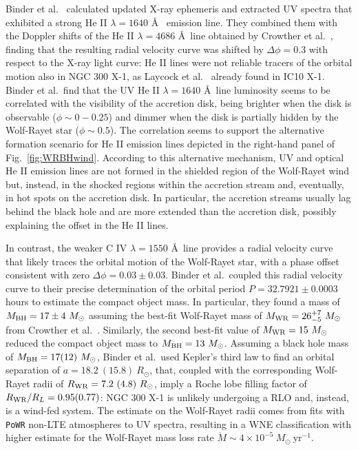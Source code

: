 \documentclass[a4paper,titlepage]{book}     	%
\newcommand{\sun}{\ensuremath{_\odot}}
\newcommand{\mdot}{\ensuremath{\dot{M}}}
\newcommand{\msun}{\ensuremath{M\sun}}
\newcommand{\rsun}{R_{\odot}}
\newcommand{\yr}{\text{yr}}
\newcommand{\mwr}{\ensuremath{M_\textup{WR}}}
\newcommand{\mbh}{\ensuremath{M_\textup{BH}}}
\begin{document}
Binder et al.\ \cite{NGC300X-1_Binder2021_BHpreciso} calculated updated X-ray ephemeris and extracted UV spectra that exhibited a strong He II $\lambda=1640$ \AA~ emission line. They combined them with the Doppler shifts of the He II $\lambda=4686$ \AA ~line obtained by Crowther et al.\ \cite{NGC300X-1_Crowther2010}, finding that the resulting radial velocity curve was shifted by $\Delta \phi = 0.3$ with respect to the X-ray light curve: He II lines were not reliable tracers of the orbital motion also in NGC 300 X-1, as Laycock et al.\ \cite{laycock2015_IC10X1_measuredshift} already found in IC10 X-1. Binder et al.\ find that the UV He II $\lambda=1640$ \AA~line luminosity seems to be correlated with the visibility of the accretion disk, being brighter when the disk is observable ($\phi \sim 0-0.25$) and dimmer when the disk is partially hidden by the Wolf-Rayet star ($\phi \sim 0.5$). The correlation seems to support the alternative formation scenario for He II emission lines depicted in the right-hand panel of Fig.\ \ref{fig:WRBHwind}. According to this alternative mechanism, UV and optical He II emission lines are not formed in the shielded region of the Wolf-Rayet wind but, instead, in the shocked regions within the accretion stream and, eventually, in hot spots on the accretion disk. In particular, the accretion streams usually lag behind the black hole and are more extended than the accretion disk, possibly explaining the offset in the He II lines.

In contrast, the weaker C IV $\lambda=1550$ \AA~line provides a radial velocity curve that likely traces the orbital motion of the Wolf-Rayet star, with a phase offset consistent with zero $\Delta \phi = 0.03 \pm 0.03$. Binder et al.\ coupled this radial velocity curve to their precise determination of the orbital period $P=32.7921 \pm 0.0003$ hours to estimate the compact object mass. In particular, they found a mass of $\mbh = 17 \pm 4~\msun$ assuming the best-fit Wolf-Rayet mass of $\mwr = 26_{-5}^{+7}~\msun$ from Crowther et al.\ \cite{NGC300X-1_Crowther2010}. Similarly, the second best-fit value of $\mwr = 15~\msun$ reduced the compact object mass to $\mbh = 13~\msun$. Assuming a black hole mass of $\mbh = 17(12)~\msun$, Binder et al.\ used Kepler's third law to find an orbital separation of $a = 18.2~(15.8)~\rsun$, that, coupled with the corresponding Wolf-Rayet radii of $R_{\rm WR} = 7.2~(4.8)~\rsun$, imply a Roche lobe filling factor of $R_{\rm WR}/R_L = 0.95 (0.77)$: NGC 300 X-1 is unlikely undergoing a RLO and, instead, is a wind-fed system. The estimate on the Wolf-Rayet radii comes from fits with \texttt{PoWR} non-LTE atmospheres \cite{WRnonLTEatmospheresPoWR_Todt2015} to UV spectra, resulting in a WNE classification with higher estimate for the Wolf-Rayet mass loss rate $\mdot \sim 4 \times 10^{-5}~\msun~\yr^{-1}$.
\end{document}
